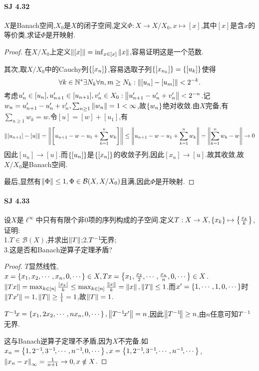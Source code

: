 \documentclass[UTF8]{article}
\begin{document}
\paragraph*{SJ 4.32}$X$是Banach空间,$X_0$是$X$的闭子空间,定义$\Phi:X\to X/X_0, x\mapsto [x]$,其中$[x]$是含$x$的等价类,求证$\Phi$是开映射.
\begin{proof}
    在$X/X_0$上定义$\left\|[x]\right\|=\inf_{x\in [x]}\left\|x\right\|$,容易证明这是一个范数.
    
    其次,取$X/X_0$中的Cauchy列$\left\{[x_n]\right\}$,容易选取子列$\left\{[x_{n_k}]\right\}=\left\{[u_k]\right\}$使得$$\forall k\in \mathbb{N}^*\exists N_k\forall n,m\geq N_k:\left\|[u_n]-[u_m]\right\|< 2^{-k}.$$
    考虑$u'_n\in [u_n],u'_{n+1}\in [u_{n+1}],v'_n\in X_0:\left\|u'_{n+1}-u'_n+v'_n\right\|<2^{-n}$.记$w_n=u'_{n+1}-u'_n+v'_n,\sum_{n\geq 1}\left\|w_n\right\|=1<\infty$,故$\left\{w_n\right\}$绝对收敛.由$X$完备,有$\sum_{n\geq 1}w_k=w$.令$[u]=[w]+[u_1]$,有$$\left\|[u_{n+1}]-[u]\right\|=\left\|\left[u_{n+1}-w-u_1+\sum_{k=1}^n w_k\right]\right\|\leq \left\|u_{n+1}-w-u_1+\sum_{k=1}^n w_k\right\|=\left\|\sum_{k=1}^n w_k-w\right\|\to 0$$
    因此$[u_n]\to [u]$.而$\left\{[u_n]\right\}$是$\left\{[x_n]\right\}$的收敛子列,因此$[x_n]\to [u]$.故其收敛,故$X/X_0$是Banach空间.

    最后,显然有$\left\|\Phi\right\|\leq 1,\Phi\in \mathcal{B}(X,X/X_0)$且满,因此$\Phi$是开映射.
\end{proof}

\paragraph*{SJ 4.33}设$X$是$\ell^\infty$中只有有限个非0项的序列构成的子空间.定义$T:X\to X, \left\{x_k\right\}\mapsto \left\{\frac{x_k}{k}\right\}$,证明:\\
1.$T\in\mathcal{B}(X)$,并求出$\left\|T\right\|$;2.$T^{-1}\!$无界;\\
3.这是否和Banach逆算子定理矛盾?
\begin{proof}
    $T$显然线性,$x=\left\{x_1,x_2,\cdots,x_n,0,\cdots\right\}\in X, Tx=\left\{x_1,\frac{x_2}{2},\cdots,\frac{x_n}{n},0,\cdots\right\}\in X$.$\left\|Tx\right\|=\max_{k\in [n]}\frac{\left|x_k\right|}{k}\leq \max_{k\in [n]}\frac{\left\|x\right\|}{k}=\left\|x\right\|,\left\|T\right\|\leq 1$.而$x'=\left\{1,\cdots,1,0,\cdots\right\}$时$\left\|Tx'\right\|=1,\left\|T\right\|\geq \frac{1}{1}=1$,故$\left\|T\right\|=1$.

    $T^{-1}\! x=\left\{x_1,2x_2,\cdots,nx_n,0,\cdots\right\},\left\|T^{-1}\! x'\right\|=n$,因此$\left\|T^{-1}\!\right\|\geq n$,由$n$任意可知$T^{-1}\!$无界.

    这与Banach逆算子定理不矛盾,因为$X$不完备.如$x_n=\left\{1,2^{-1}\!,3^{-1}\!,\cdots,n^{-1}\!,0,\cdots\right\},x=\left\{1,2^{-1}\!,3^{-1}\!,\cdots,n^{-1}\!,\cdots\right\}$,\\
    $\left\|x_n-x\right\|_\infty=\frac{1}{n+1}\to 0,x\notin X$.
\end{proof}
\end{document}
